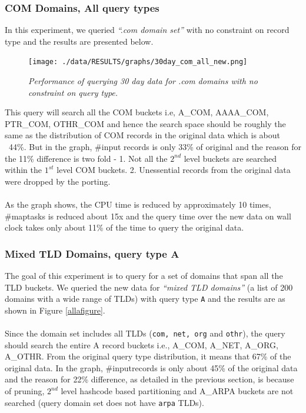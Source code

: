 \documentclass[11pt,a4paper]{article}
\begin{document}
\subsubsection{COM Domains, All query types}
In this experiment, we queried \textit{``.com domain set''} with no constraint on record type and the results are presented below.

\begin{figure}[H] 
\centering
\texttt{[image: ./data/RESULTS/graphs/30day\_com\_all\_new.png]}
\caption {\textit{Performance of querying 30 day data for .com domains with no constraint on query type.}}
\end{figure}

\noindent
This query will search all the COM buckets i.e, A\_COM, AAAA\_COM, PTR\_COM, OTHR\_COM and hence the search space should be roughly the same as the distribution of COM records in the original data which is about ~44\%. But in the graph, \#input records is only 33\% of original and the reason for the 11\% difference is two fold - 1. Not all the $2^{nd}$ level buckets are searched within the $1^{st}$ level COM buckets. 2. Unessential records from the original data were dropped by the porting.
\\\\
As the graph shows, the CPU time is reduced by approximately 10 times, \#maptasks is reduced about 15x and the query time over the new data on wall clock takes only about 11\% of the time to query the original data.

\subsubsection{Mixed TLD Domains, query type A}
The goal of this experiment is to query for a set of domains that span all the TLD buckets. We queried the new data for \textit{``mixed TLD domains''} (a list of 200 domains with a wide range of TLDs) with query type \texttt{A} and the results are as shown in Figure \ref{allafigure}.
\\\\
Since the domain set includes all TLDs (\texttt{com, net, org} and \texttt{othr}), the query should search the entire A record buckets i.e., A\_COM, A\_NET, A\_ORG, A\_OTHR. From the original query type distribution, it means that 67\% of the original data. In the graph, \#inputrecords is only about 45\% of the original data and the reason for 22\% difference, as detailed in the previous section, is because of pruning, $2^{nd}$ level hashcode based partitioning and A\_ARPA buckets are not searched (query domain set does not have \texttt{arpa} TLDs).  
\end{document}
